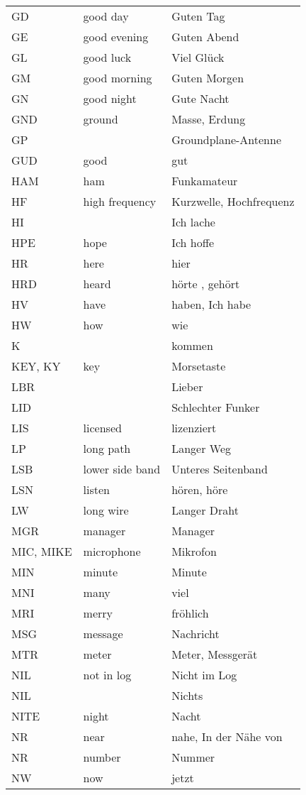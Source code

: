 \begin{tabular}{lll}
GD & good day & Guten Tag \\
GE & good evening & Guten Abend \\
GL & good luck & Viel Glück \\
GM & good morning & Guten Morgen \\
GN & good night & Gute Nacht \\
GND & ground & Masse, Erdung \\
GP &  & Groundplane-Antenne \\
GUD & good & gut \\
HAM & ham & Funkamateur \\
HF & high frequency & Kurzwelle, Hochfrequenz \\
HI &  & Ich lache \\
HPE & hope & Ich hoffe \\
HR & here & hier \\
HRD & heard & hörte , gehört \\
HV & have & haben, Ich habe \\
HW & how & wie \\
K &  & kommen \\
KEY, KY & key & Morsetaste \\
LBR &  & Lieber \\
LID &  & Schlechter Funker \\
LIS & licensed & lizenziert \\
LP & long path & Langer Weg \\
LSB & lower side band & Unteres Seitenband \\
LSN & listen & hören, höre \\
LW & long wire & Langer Draht \\
MGR & manager & Manager \\
MIC, MIKE & microphone & Mikrofon \\
MIN & minute & Minute \\
MNI & many & viel \\
MRI & merry & fröhlich \\
MSG & message & Nachricht \\
MTR & meter & Meter, Messgerät \\
NIL & not in log & Nicht im Log \\
NIL &  & Nichts \\
NITE & night & Nacht \\
NR & near & nahe, In der Nähe von \\
NR & number & Nummer \\
NW & now & jetzt \\

\end{tabular}
